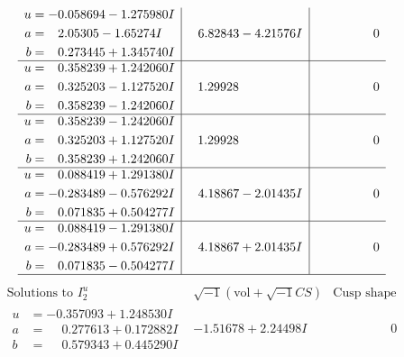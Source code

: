 \documentclass[1p]{elsarticle_modified}
\theoremstyle{definition}
\newcommand{\I}{\sqrt{-1}}
\begin{document}
$$\begin{array}{c|c|c}
\begin{aligned}
u &= -0.058694 - 1.275980 I \\
a &= \phantom{-}2.05305 - 1.65274 I \\
b &= \phantom{-}0.273445 + 1.345740 I\end{aligned}
 & \phantom{-}6.82843 - 4.21576 I & \phantom{-0.000000 } 0 \\ \hline\begin{aligned}
u &= \phantom{-}0.358239 + 1.242060 I \\
a &= \phantom{-}0.325203 - 1.127520 I \\
b &= \phantom{-}0.358239 - 1.242060 I\end{aligned}
 & \phantom{-}1.29928\phantom{ +0.000000I} & \phantom{-0.000000 } 0 \\ \hline\begin{aligned}
u &= \phantom{-}0.358239 - 1.242060 I \\
a &= \phantom{-}0.325203 + 1.127520 I \\
b &= \phantom{-}0.358239 + 1.242060 I\end{aligned}
 & \phantom{-}1.29928\phantom{ +0.000000I} & \phantom{-0.000000 } 0 \\ \hline\begin{aligned}
u &= \phantom{-}0.088419 + 1.291380 I \\
a &= -0.283489 - 0.576292 I \\
b &= \phantom{-}0.071835 + 0.504277 I\end{aligned}
 & \phantom{-}4.18867 - 2.01435 I & \phantom{-0.000000 } 0 \\ \hline\begin{aligned}
u &= \phantom{-}0.088419 - 1.291380 I \\
a &= -0.283489 + 0.576292 I \\
b &= \phantom{-}0.071835 - 0.504277 I\end{aligned}
 & \phantom{-}4.18867 + 2.01435 I & \phantom{-0.000000 } 0\\
 \hline 
 \end{array}$$\newpage$$\begin{array}{c|c|c}  
\text{Solutions to }I^u_{2}& \I (\text{vol} + \sqrt{-1}CS) & \text{Cusp shape}\\
 \hline 
\begin{aligned}
u &= -0.357093 + 1.248530 I \\
a &= \phantom{-}0.277613 + 0.172882 I \\
b &= \phantom{-}0.579343 + 0.445290 I\end{aligned}
 & -1.51678 + 2.24498 I & \phantom{-0.000000 } 0 \\ \hline\begin{aligned}

\end{aligned}
\end{array}$$
\end{document}
